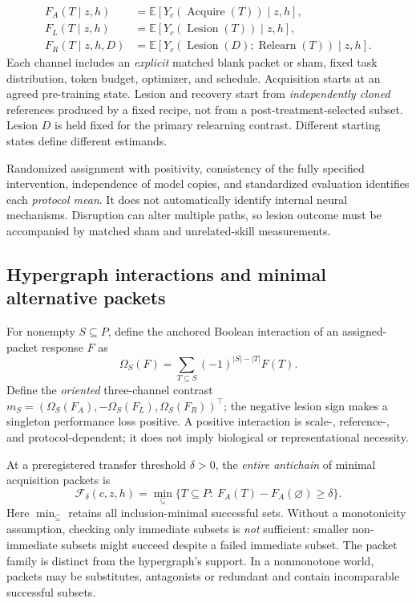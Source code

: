\documentclass[11pt,a4paper]{article}
\newcommand{\E}{\mathbb{E}}\newcommand{\Prb}{\mathbb{P}}
\newcommand{\F}{\mathcal{F}}\newcommand{\D}{\mathcal{D}}
\theoremstyle{definition}\newtheorem{definition}[theorem]{Definition}
\theoremstyle{remark}\newtheorem{remark}[theorem]{Remark}
\begin{document}
\begin{align}
 F_A(T\mid z,h)&=\E[Y_c(\operatorname{Acquire}(T))\mid z,h],\label{eq:FA}\\
 F_L(T\mid z,h)&=\E[Y_c(\operatorname{Lesion}(T))\mid z,h],\\
 F_R(T\mid z,h,D)&=\E[Y_c(\operatorname{Lesion}(D);\operatorname{Relearn}(T))\mid z,h].\label{eq:FR}
\end{align}
Each channel includes an \emph{explicit} matched blank packet or sham, fixed task distribution, token budget, optimizer, and schedule. Acquisition starts at an agreed pre-training state. Lesion and recovery start from \emph{independently cloned} references produced by a fixed recipe, not from a post-treatment-selected subset. Lesion $D$ is held fixed for the primary relearning contrast. Different starting states define different estimands.

Randomized assignment with positivity, consistency of the fully specified intervention, independence of model copies, and standardized evaluation identifies each \emph{protocol mean}. It does not automatically identify internal neural mechanisms. Disruption can alter multiple paths, so lesion outcome must be accompanied by matched sham and unrelated-skill measurements.

\subsection{Hypergraph interactions and minimal alternative packets}
For nonempty $S\subseteq P$, define the anchored Boolean interaction of an assigned-packet response $F$ as
\begin{equation}\label{eq:mobius}
 \Omega_S(F)=\sum_{T\subseteq S}(-1)^{|S|-|T|}F(T).
\end{equation}
Define the \emph{oriented} three-channel contrast $m_S=(\Omega_S(F_A),-\Omega_S(F_L),\Omega_S(F_R))^\top$; the negative lesion sign makes a singleton performance loss positive. A positive interaction is scale-, reference-, and protocol-dependent; it does not imply biological or representational necessity.

At a preregistered transfer threshold $\delta>0$, the \emph{entire antichain} of minimal acquisition packets is
\begin{equation}\label{eq:family}
 \F_\delta(c,z,h)=\min_{\subseteq}\big\{T\subseteq P:\ F_A(T)-F_A(\varnothing)\ge \delta\big\}.
\end{equation}
Here $\min_{\subseteq}$ retains all inclusion-minimal successful sets. Without a monotonicity assumption, checking only immediate subsets is \emph{not} sufficient: smaller non-immediate subsets might succeed despite a failed immediate subset. The packet family is distinct from the hypergraph's support. In a nonmonotone world, packets may be substitutes, antagonists or redundant and contain incomparable successful subsets.
\end{document}
